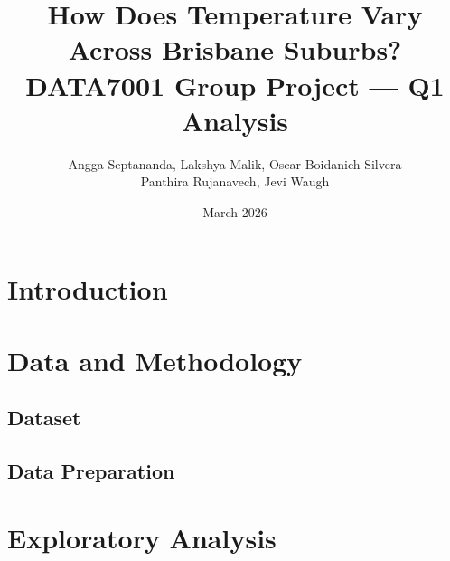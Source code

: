 \documentclass{article}
\title{How Does Temperature Vary Across Brisbane Suburbs?\\
       \large DATA7001 Group Project — Q1 Analysis}
\author{Angga Septananda, Lakshya Malik, Oscar Boidanich Silvera \\
        Panthira Rujanavech, Jevi Waugh}
\date{March 2026}
\begin{document}
\maketitle

\begin{abstract}
\end{abstract}

\section{Introduction}

\section{Data and Methodology}

\subsection{Dataset}

\subsection{Data Preparation}

\section{Exploratory Analysis}
\label{sec:exploratory}
\end{document}
